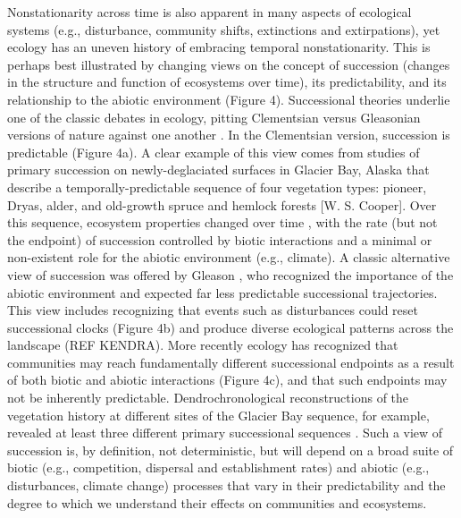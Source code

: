 \documentclass[11pt,a4paper,oneside]{article}
\begin{document}
Nonstationarity across time is also apparent in many aspects of ecological systems (e.g., disturbance, community shifts, extinctions and extirpations), yet ecology has an uneven history of embracing temporal nonstationarity. This is perhaps best illustrated by changing views on the concept of succession (changes in the structure and function of ecosystems over time), its predictability, and its relationship to the abiotic environment (Figure 4). Successional theories underlie one of the classic debates in ecology, pitting Clementsian versus Gleasonian versions of nature against one another \citep{clementsbook,gleason1926}. In the Clementsian version, succession is predictable (Figure 4a). A clear example of this view comes from studies of primary succession on newly-deglaciated surfaces in Glacier Bay, Alaska that describe a temporally-predictable sequence of four vegetation types: pioneer, Dryas, alder, and old-growth spruce and hemlock forests [W. S. Cooper]. Over this sequence, ecosystem properties changed over time \citep{Chapin1994}, with the rate (but not the endpoint) of succession controlled by biotic interactions and a minimal or non-existent role for the abiotic environment (e.g., climate). A classic alternative view of succession was offered by Gleason \citep{gleason1926}, who recognized the importance of the abiotic environment and expected far less predictable successional trajectories. This view includes recognizing that events such as disturbances could reset successional clocks (Figure 4b) and produce diverse ecological patterns across the landscape \citep{Levin:1992rg} (REF KENDRA). More recently ecology has recognized that communities may reach fundamentally different successional endpoints as a result of both biotic and abiotic interactions (Figure 4c), and that such endpoints may not be inherently predictable. Dendrochronological reconstructions of the vegetation history at different sites of the Glacier Bay sequence, for example, revealed at least three different primary successional sequences \citep{Fastie1995}. Such a view of succession is, by definition, not deterministic, but will depend on a broad suite of biotic (e.g., competition, dispersal and establishment rates) and abiotic (e.g., disturbances, climate change) processes that vary in their predictability and the degree to which we understand their effects on communities and ecosystems.\\
\end{document}

